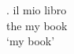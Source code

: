 

{\GlossTransSide
\ex. \gll il mio libro\exannot{[DP]}\\
          the my book\\
     \glt `my book'
}

